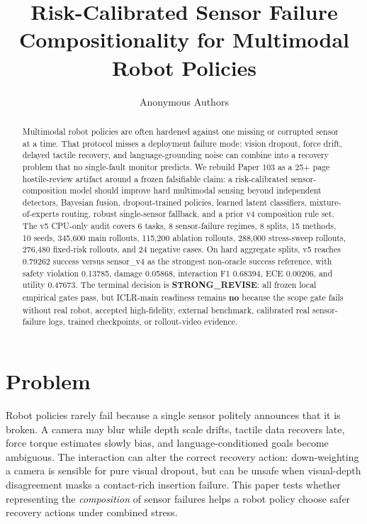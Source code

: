 \documentclass{article}
\title{Risk-Calibrated Sensor Failure Compositionality for Multimodal Robot Policies}
\author{Anonymous Authors}
\begin{document}
\raggedbottom
\maketitle

\begin{abstract}
Multimodal robot policies are often hardened against one missing or corrupted sensor at a time. That protocol misses a deployment failure mode: vision dropout, force drift, delayed tactile recovery, and language-grounding noise can combine into a recovery problem that no single-fault monitor predicts. We rebuild Paper 103 as a 25+ page hostile-review artifact around a frozen falsifiable claim: a risk-calibrated sensor-composition model should improve hard multimodal sensing beyond independent detectors, Bayesian fusion, dropout-trained policies, learned latent classifiers, mixture-of-experts routing, robust single-sensor fallback, and a prior v4 composition rule set. The v5 CPU-only audit covers 6 tasks, 8 sensor-failure regimes, 8 splits, 15 methods, 10 seeds, 345,600 main rollouts, 115,200 ablation rollouts, 288,000 stress-sweep rollouts, 276,480 fixed-risk rollouts, and 24 negative cases. On hard aggregate splits, v5 reaches 0.79262 success versus sensor\_v4 as the strongest non-oracle success reference, with safety violation 0.13785, damage 0.05868, interaction F1 0.68394, ECE 0.00206, and utility 0.47673. The terminal decision is \textbf{STRONG\_REVISE}: all frozen local empirical gates pass, but ICLR-main readiness remains \textbf{no} because the scope gate fails without real robot, accepted high-fidelity, external benchmark, calibrated real sensor-failure logs, trained checkpoints, or rollout-video evidence.
\end{abstract}

\section{Problem}
Robot policies rarely fail because a single sensor politely announces that it is broken. A camera may blur while depth scale drifts, tactile data recovers late, force torque estimates slowly bias, and language-conditioned goals become ambiguous. The interaction can alter the correct recovery action: down-weighting a camera is sensible for pure visual dropout, but can be unsafe when visual-depth disagreement masks a contact-rich insertion failure. This paper tests whether representing the \emph{composition} of sensor failures helps a robot policy choose safer recovery actions under combined stress.
\end{document}
